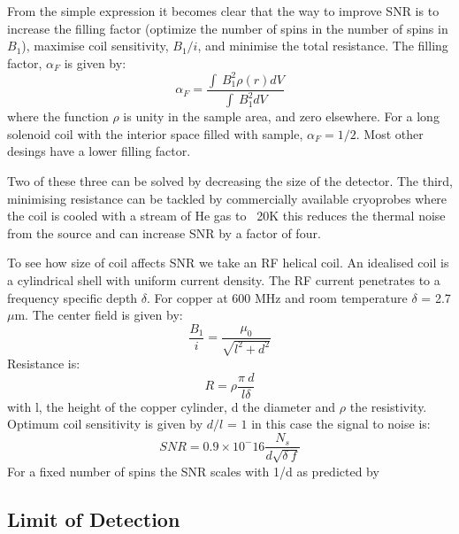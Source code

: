 From the simple expression it becomes clear that the way to improve SNR is to increase the filling factor
(optimize the number of spins in the number of spins in $B_1$), maximise coil sensitivity, $B_1/i$, and
minimise the total resistance. The filling factor, $\alpha_F$ is given by:
\begin{equation}\label{eqn:FillingFactor}
  \alpha_F = \frac{\int~B_1^2\rho(r)dV}{\int~B_1^2dV}
\end{equation}
where the function $\rho$ is unity in the sample area, and zero elsewhere. For a long solenoid coil with the
interior space filled with sample, $\alpha_F = 1/2$. Most other desings have a lower filling factor.

Two of these three can be solved by decreasing the size of the detector. The third, minimising resistance
can be tackled by commercially available cryoprobes where the coil is cooled with a stream of He gas to
~20K this reduces the thermal noise from the source and can increase SNR by a factor of four.

To see how size of coil affects SNR we take an RF helical coil. An idealised coil
is a cylindrical shell with uniform current density. The RF current penetrates to a frequency
specific depth $\delta$. For copper at 600 MHz and room temperature $\delta$ = 2.7 $\mu$m. The center
field is given by:
\begin{equation}
  \frac{B_1}{i} = \frac{\mu_0}{\sqrt{l^2+d^2}}
\end{equation}
Resistance is:
\begin{equation}
  R = \rho\frac{\pi~d}{l\delta}
\end{equation}
with l, the height of the copper cylinder, d the diameter and $\rho$ the resistivity.
Optimum coil sensitivity is given by $d/l$ = $1$ in this case the signal to noise is:
\begin{equation}
  SNR = 0.9\times10^-16\frac{N_s}{d\sqrt{\delta~f}}
\end{equation}
For a fixed number of spins the SNR scales with 1/d as predicted by \citep{Hoult:1976dw}

\subsection{Limit of Detection}

